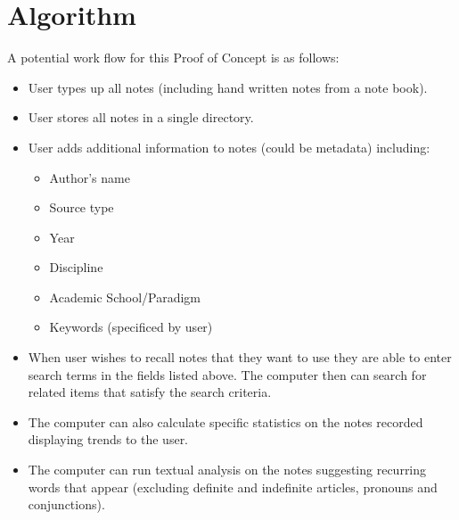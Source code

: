 \documentclass{article}
\begin{document}
\section{Algorithm}

A potential work flow for this Proof of Concept is as follows:

\begin{itemize}
    \item User types up all notes (including hand written notes from a note book).
    \item User stores all notes in a single directory.
    \item User adds additional information to notes (could be metadata) including:
        \begin{itemize}
            \item Author's name
            \item Source type
            \item Year
            \item Discipline
            \item Academic School/Paradigm
            \item Keywords (specificed by user)
        \end{itemize}
    \item When user wishes to recall notes that they want to use they are able to enter search terms in the fields listed above. The computer then can search for related items that satisfy the search criteria.
    \item The computer can also calculate specific statistics on the notes recorded displaying trends to the user.
    \item The computer can run textual analysis on the notes suggesting recurring words that appear (excluding definite and indefinite articles, pronouns and conjunctions).
\end{itemize}
\end{document}
